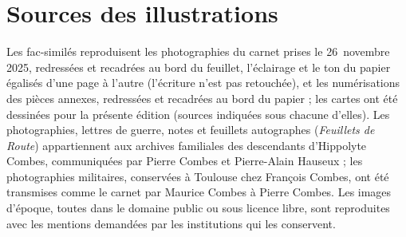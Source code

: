 \section{Sources des illustrations}\label{annexe-illustrations}

{\footnotesize Les fac-similés reproduisent les photographies du carnet prises le 26~novembre 2025, redressées et recadrées au bord du feuillet, l'éclairage et le ton du papier égalisés d'une page à l'autre (l'écriture n'est pas retouchée), et les numérisations des pièces annexes, redressées et recadrées au bord du papier ; les cartes ont été dessinées pour la présente édition (sources indiquées sous chacune d'elles). Les photographies, lettres de guerre, notes et feuillets autographes (\textit{Feuillets de Route}) appartiennent aux archives familiales des descendants d'Hippolyte Combes, communiquées par Pierre Combes et Pierre-Alain Hauseux ; les photographies militaires, conservées à Toulouse chez François Combes, ont été transmises comme le carnet par Maurice Combes à Pierre Combes. Les images d'époque, toutes dans le domaine public ou sous licence libre, sont reproduites avec les mentions demandées par les institutions qui les conservent.\par}

